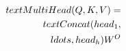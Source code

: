 \documentclass[preview]{standalone}
\begin{document}
\begin{align*}
\special{dvisvgm:raw <g id='unique000'>}\\text{MultiHead}(Q,K,V) = \\text{Concat}(head_1, \\ldots, head_h)W^O\special{dvisvgm:raw </g>}
\end{align*}
\end{document}
